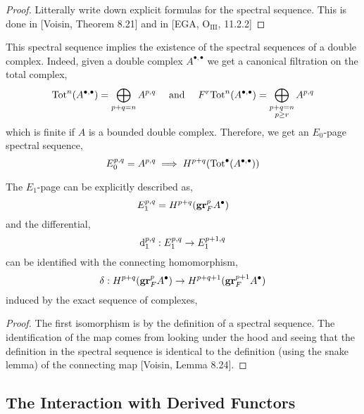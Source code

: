 \documentclass[12pt]{article}
\begin{document}
\begin{proof}
Litterally write down explicit formulas for the spectral sequence. This is done in [Voisin, Theorem 8.21] and in [EGA, $\mathrm{O_{III}}$, 11.2.2] 
\end{proof}

\begin{rmk}
This spectral sequence implies the existence of the spectral sequences of a double complex. Indeed, given a double complex $A^{\bullet, \bullet}$ we get a canonical filtration on the total complex,
\[ \mathrm{Tot}^n(A^{\bullet, \bullet}) = \bigoplus_{p+q = n} A^{p,q} \quad \text{ and } \quad F^r \mathrm{Tot}^n(A^{\bullet, \bullet}) = \bigoplus_{\substack{p + q = n \\ p \ge r}} A^{p,q} \]
which is finite if $A$ is a bounded double complex. Therefore, we get an $E_0$-page spectral sequence,
\[ E^{p,q}_0 = A^{p,q} \implies H^{p+q}(\mathrm{Tot}^\bullet(A^{\bullet, \bullet})) \]
\end{rmk}

\begin{lemma}
The $E_1$-page can be explicitly described as,
\[ E_1^{p,q} = H^{p+q}(\mathbf{gr}^p_F A^\bullet) \]
and the differential,
\[ \mathrm{d}_1^{p,q} : E_1^{p,q} \to E_1^{p+1,q} \]
can be identified with the connecting homomorphism,
\[ \delta : H^{p+q}(\mathbf{gr}^p_F A^\bullet) \to H^{p+q+1}(\mathbf{gr}_F^{p+1} A^\bullet) \]
induced by the exact sequence of complexes,
\begin{center}
\end{center}
\end{lemma}

\begin{proof}
The first isomorphism is by the definition of a spectral sequence. The identification of the map comes from looking under the hood and seeing that the definition in the spectral sequence is identical to the definition (using the snake lemma) of the connecting map [Voisin, Lemma 8.24].
\end{proof}

\subsection{The Interaction with Derived Functors}
\end{document}
